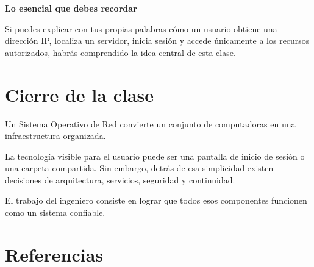 \documentclass[
  spanish,
  letterpaper,
]{scrbook}
\begin{document}
\begin{tcolorbox}[enhanced jigsaw, arc=.35mm, bottomrule=.15mm, breakable, colback=white, colframe=quarto-callout-tip-color-frame, left=2mm, leftrule=.75mm, opacityback=0, rightrule=.15mm, toprule=.15mm]
\begin{minipage}[t]{5.5mm}
\textcolor{quarto-callout-tip-color}{\faLightbulb}
\end{minipage}%
\begin{minipage}[t]{\textwidth - 5.5mm}

\vspace{-3mm}\textbf{Lo esencial que debes recordar}\vspace{3mm}

Si puedes explicar con tus propias palabras cómo un usuario obtiene una
dirección IP, localiza un servidor, inicia sesión y accede únicamente a
los recursos autorizados, habrás comprendido la idea central de esta
clase.

\end{minipage}%
\end{tcolorbox}


\chapter{Cierre de la clase}\label{cierre-de-la-clase}

Un Sistema Operativo de Red convierte un conjunto de computadoras en una
infraestructura organizada.

La tecnología visible para el usuario puede ser una pantalla de inicio
de sesión o una carpeta compartida. Sin embargo, detrás de esa
simplicidad existen decisiones de arquitectura, servicios, seguridad y
continuidad.

El trabajo del ingeniero consiste en lograr que todos esos componentes
funcionen como un sistema confiable.


\chapter{Referencias}\label{referencias}
\end{document}
